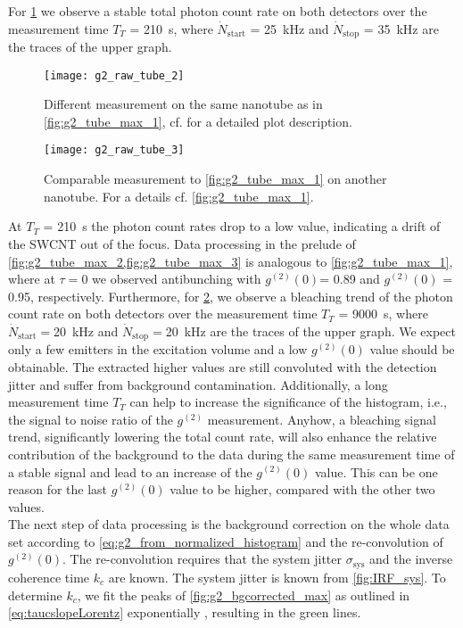 For \cref{fig:g2_tube_max_2} we observe a stable total photon count rate on both detectors over the measurement time $T_T$ = \SI{210}{\s}, where $\dot{N}_\mathrm{start}$ = \SI{25}{\kHz} and $\dot{N}_\mathrm{stop}$ = \SI{35}{\kHz} are the traces of the upper graph.
\begin{figure}[htp]
	\centering
	\texttt{[image: g2\_raw\_tube\_2]}
	\caption{Different measurement on the same nanotube as in \cref{fig:g2_tube_max_1}, cf. for a detailed plot description.}
	\label{fig:g2_tube_max_2}
\end{figure}
\begin{figure}[h!]
	\centering
	\texttt{[image: g2\_raw\_tube\_3]}
	\caption{Comparable measurement to \cref{fig:g2_tube_max_1} on another nanotube. For a details cf. \cref{fig:g2_tube_max_1}.}
	\label{fig:g2_tube_max_3}
\end{figure}
\noindent At $T_T$ = \SI{210}{\s} the photon count rates drop to a low value, indicating a drift of the \ac{SWCNT} out of the focus. Data processing in the prelude of \cref{fig:g2_tube_max_2,fig:g2_tube_max_3} is analogous to \cref{fig:g2_tube_max_1}, where at $\tau=0$ we observed antibunching with $g^{(2)}(0)$= \num{0.89} and $g^{(2)}(0)$ = \num{0.95}, respectively. Furthermore, for \cref{fig:g2_tube_max_3}, we observe a bleaching trend of the photon count rate on both detectors over the measurement time $T_T$ = \SI{9000}{\s}, where $\dot{N}_\mathrm{start} = $\SI{20}{\kHz} and $\dot{N}_\mathrm{stop} = $\SI{20}{\kHz} are the traces of the upper graph. We expect only a few emitters in the excitation volume and a low $g^{(2)}(0)$ value should be obtainable. The extracted higher values are still convoluted with the detection jitter and suffer from background contamination. Additionally, a long measurement time $T_T$ can help to increase the significance of the histogram, i.e., the signal to noise ratio of the $g^{(2)}$ measurement. Anyhow, a bleaching signal trend, significantly lowering the total count rate, will also enhance the relative contribution of the background to the data during the same measurement time of a stable signal and lead to an increase of the $g^{(2)}(0)$ value. This can be one reason for the last $g^{(2)}(0)$ value to be higher, compared with the other two values.\\
The next step of data processing is the background correction on the whole data set according to \cref{eq:g2_from_normalized_histogram} and the re-convolution of $g^{(2)}(0)$. The re-convolution requires that the system jitter $\sigma_\mathrm{sys}$ and the inverse coherence time $k_c$ are known. The system jitter is known from \cref{fig:IRF_sys}. To determine $k_c$, we fit the peaks of \cref{fig:g2_bgcorrected_max} as outlined in \cref{eq:taucslopeLorentz} exponentially \cite{beveratos_room_2002}, resulting in the green lines. 
